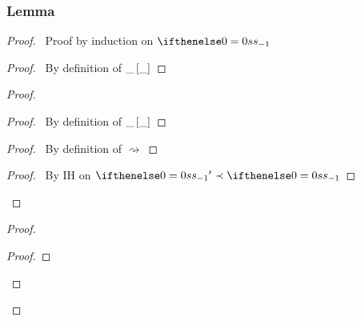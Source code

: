 \documentclass[a4paper]{article}
\begin{document}
\subsubsection{Lemma} \label{lemma-simpl-stable-context}
\begin{proof}
  \pfsketch\ Proof by induction on $\aStack$
  \begin{proof}
    \pf\ By definition of $\_ \left[ \_ \right]$
  \end{proof}
  \begin{proof}
    \begin{proof}
      \pf\ By definition of $\_ \left[ \_ \right]$  
    \end{proof}
    \begin{proof}
      \pf\ By definition of $\rightsquigarrow$ 
    \end{proof}
    \qedstep
    \begin{proof}
      \pf\ By IH on $\aStack' \prec \aStack$
    \end{proof}
  \end{proof}
  \begin{proof}
    \begin{proof}

\end{proof}
\end{proof}
\end{proof}
\end{document}
